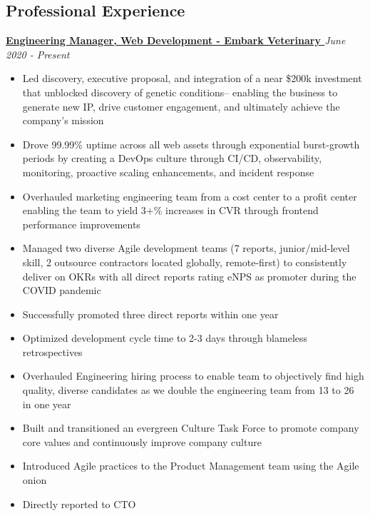 \documentclass[line]{res}
\begin{document}
\begin{resume}
\section{{Professional Experience}} 
\vspace{8pt}
{\bf \underline{Engineering Manager, Web Development - Embark Veterinary }} \hfill {\sl June 2020 - Present}\\[2pt]
 \begin{itemize} \itemsep -1pt %
	\item Led discovery, executive proposal, and integration of a near \$200k investment that unblocked discovery of genetic conditions-- enabling the business to generate new IP, drive customer engagement, and ultimately achieve the company's mission
	\item Drove 99.99\% uptime across all web assets through exponential burst-growth periods by creating a DevOps culture through CI/CD, observability, monitoring, proactive scaling enhancements, and incident response
	\item Overhauled marketing engineering team from a cost center to a profit center enabling the team to yield 3+\% increases in CVR through frontend performance improvements
	\item Managed two diverse Agile development teams (7 reports, junior/mid-level skill, 2 outsource contractors located globally, remote-first) to consistently deliver on OKRs with all direct reports rating eNPS as promoter during the COVID pandemic
	\item Successfully promoted three direct reports within one year
	\item Optimized development cycle time to 2-3 days through blameless retrospectives
	\item Overhauled Engineering hiring process to enable team to objectively find high quality, diverse candidates as we double the engineering team from 13 to 26 in one year
	\item Built and transitioned an evergreen Culture Task Force to promote company core values and continuously improve company culture
	\item Introduced Agile practices to the Product Management team using the Agile onion
	\item Directly reported to CTO
 \end{itemize}
 

\end{resume}
\end{document}
